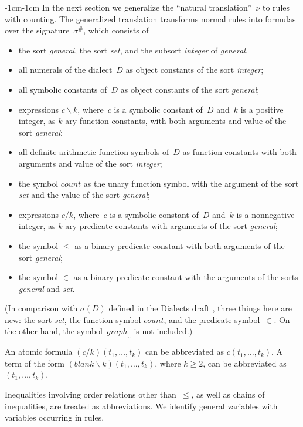 \documentclass[11pt]{article}
\def\bs{\backslash}
\newcommand{\co}{\ensuremath{\mathit{count}}}
\begin{document}
\begin{adjustwidth}{-1cm}{-1cm}
In the next section we  generalize the ``natural translation''~$\nu$
\cite{lif21,lif23,fan26b,fan26} to rules with counting. The
generalized translation transforms normal rules into formulas over
the signature~$\sigma^\#$, which consists of
\begin{itemize}
\item [(i)] the sort \emph{general}, the sort \emph{set}, and the
  subsort \emph{integer} of \emph{general},
\item [(ii)] all numerals of the dialect~$D$ as object constants of the
  sort \emph{integer};
\item [(iii)] all symbolic constants of~$D$ as object
   constants of the sort \emph{general};
 \item [(iv)] expressions $c\bs k$, where~$c$ is a symbolic constant of~$D$
   and~$k$ is a positive integer, as $k$-ary function constants, with
   both arguments and value of the sort \emph{general};
\item [(v)] all definite arithmetic
  function symbols of~$D$ as function constants with both
  arguments and value of the sort \emph{integer};
\item[(vi)] the symbol $\co$ as the unary function symbol with the argument
  of the sort \emph{set} and the value of the sort \emph{general};
\item [(vii)] expressions $c/k$, where~$c$ is a symbolic constant of~$D$
  and~$k$ is a nonnegative integer, as $k$-ary predicate constants
  with arguments of the sort \emph{general};
\item [(viii)] the symbol $\leq$ as a binary predicate constant with both
  arguments of the sort \emph{general};
\item [(ix)] the symbol $\in$ as a binary predicate constant with the
  arguments of the sorts \emph{general} and \emph{set}.
\end{itemize}
(In comparison with $\sigma(D)$ defined in the Dialects draft
\cite[Section~4.1]{fan26b}, three things here
are new: the sort \emph{set}, the function symbol $\co$, and the
predicate symbol~$\in$.  On the other hand, the
symbol~$\mathit{graph}_{..}$ is not included.)

An atomic formula $(c/k)(t_1,\dots,t_k)$ can be abbreviated
as $c(t_1,\dots,t_k)$.
A term of the form $(\mathit{blank}\bs k)(t_1,\dots,t_k)$, where $k\geq 2$,
can be abbreviated as $(t_1,\dots,t_k)$.

Inequalities involving order relations other than~$\leq$, as well as chains
of inequalities, are treated as abbreviations. We identify general variables
with variables occurring in rules.


\end{adjustwidth}
\end{document}
